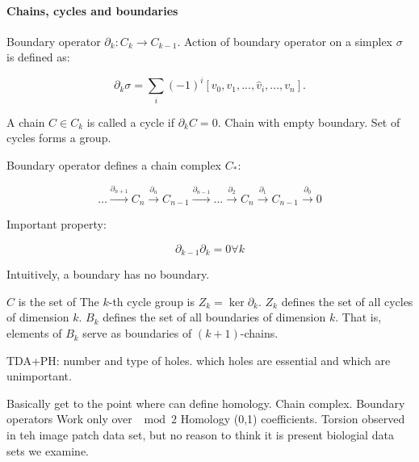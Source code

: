 \begin{figure}
\centering
\caption[Simplicial Complex]{}
\label{background:fig:simplicial_complex}
\end{figure}

\paragraph{Chains, cycles and boundaries}

Boundary operator $\partial_{k}:C_{k}\rightarrow C_{k-1}$.
Action of boundary operator on a simplex $\sigma$ is defined as: 

\begin{equation}
\partial_{k}\sigma = \displaystyle\sum_{i}(-1)^{i}[v_{0},v_{1},...,\hat{v}_{i},...,v_{n}].
\end{equation}

A chain $C\in C_{k}$ is called a cycle if $\partial_{k}C=0$.
Chain with empty boundary.
Set of cycles forms a group.

Boundary operator defines a chain complex $C_{*}$:

\begin{equation}
\dots \overset{\partial_{n+1}}{\longrightarrow} C_n \overset{\partial_{n}}{\longrightarrow} C_{n-1} \overset{\partial_{n-1}}{\longrightarrow}  ... \overset{\partial_{2}}{\longrightarrow} C_n \overset{\partial_{1}}{\longrightarrow} C_{n-1} \overset{\partial_{0}}{\longrightarrow}  0
\end{equation}

Important property:

\begin{equation}
\partial_{k-1}\partial_{k} = 0 \forall k
\end{equation}

Intuitively, a boundary has no boundary.

$C$ is the set of 
The $k$-th cycle group is $Z_{k}=\ker \partial_{k}$.
$Z_{k}$ defines the set of all cycles of dimension $k$.
$B_{k}$ defines the set of all boundaries of dimension $k$.
That is, elements of $B_{k}$ serve as boundaries of $(k+1)$-chains.

TDA+PH: number and type of holes. which holes are essential and which are unimportant.

Basically get to the point where can define homology.
Chain complex.
Boundary operators
Work only over $\mod 2$ Homology (0,1) coefficients.
Torsion observed in teh image patch data set, but no reason to think it is present biologial data sets we examine.

